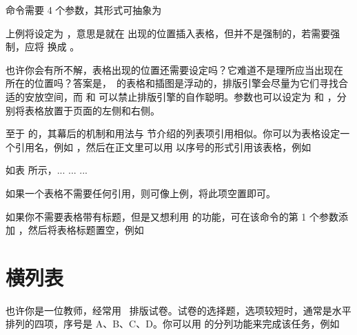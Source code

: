 
 命令需要 4 个参数，其形式可抽象为

\startTEX
{}
\stopTEX

上例将设定为 ，意思是就在  出现的位置插入表格，但并不是强制的，若需要强制，应将  换成 。

也许你会有所不解，表格出现的位置还需要设定吗？它难道不是理所应当出现在  所在的位置吗？答案是，\CONTEXT\ 的表格和插图是浮动的，排版引擎会尽量为它们寻找合适的安放空间，而  和  可以禁止排版引擎的自作聪明。参数也可以设定为  和 ，分别将表格放置于页面的左侧和右侧。

至于  的，其幕后的机制和用法与 \in[itemcite] 节介绍的列表项引用相似。你可以为表格设定一个引用名，例如 ，然后在正文里可以用  以序号的形式引用该表格，例如

\startTEX
如表 \in[foo] 所示，... ... ...\par
{}
\stopTEX

\noindent 如果一个表格不需要任何引用，则可像上例，将此项空置即可。

如果你不需要表格带有标题，但是又想利用  的功能，可在该命令的第 1 个参数添加 ，然后将表格标题置空，例如

\blank[halfline]


\startTEX
{}
\stopTEX

\section{横列表}

也许你是一位教师，经常用 \CONTEXT\ 排版试卷。试卷的选择题，选项较短时，通常是水平排列的四项，序号是 A、B、C、D。你可以用  的分列功能来完成该任务，例如

